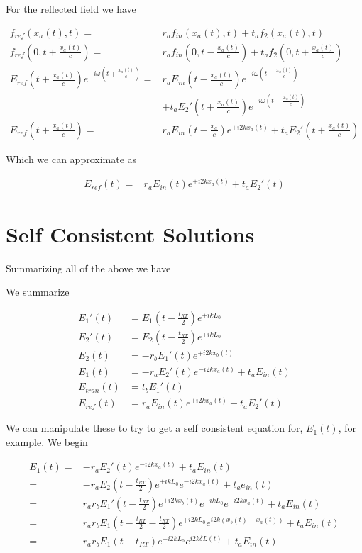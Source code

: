 \documentclass[12pt]{article}
\begin{document}
For the reflected field we have

\begin{align}
f_{ref}(x_a(t), t) =& r_a f_{in}(x_a(t), t) + t_a f_2(x_a(t), t)\\
f_{ref}\left(0, t+\frac{x_a(t)}{c}\right) =& r_a f_{in}\left(0, t-\frac{x_a(t)}{c}\right) + t_a f_2\left(0, t+\frac{x_a(t)}{c}\right)\\
E_{ref}\left(t+\frac{x_a(t)}{c}\right)e^{-i\omega\left(t+\frac{x_a(t)}{c}\right)} =& r_a E_{in}\left(t-\frac{x_a(t)}{c}\right)e^{-i\omega\left(t-\frac{x_a(t)}{c}\right)}\\
&+t_aE_2'\left(t+\frac{x_a(t)}{c}\right)e^{-i\omega\left(t+\frac{x_a(t)}{c}\right)}\\
E_{ref}\left(t+\frac{x_a(t)}{c}\right) =&r_aE_{in}\left(t-\frac{x_a}{c}\right)e^{+i2kx_a(t)} + t_aE_2'\left(t+\frac{x_a(t)}{c}\right)
\end{align}

Which we can approximate as

\begin{align}
E_{ref}(t) =&r_aE_{in}(t)e^{+i2kx_a(t)} + t_aE_2'(t)
\end{align}

\section{Self Consistent Solutions}

Summarizing all of the above we have

We summarize

\begin{align}
E_1'(t) &= E_1\left(t-\frac{t_{RT}}{2}\right)e^{+ikL_0}\\
E_2'(t) &= E_2\left(t-\frac{t_{RT}}{2}\right)e^{+ikL_0}\\
E_2(t) &= -r_b E_1'(t) e^{+i2kx_b(t)}\\
E_1(t) &= -r_a E_2'(t)e^{-i2kx_a(t)} + t_aE_{in}(t)\\
E_{tran}(t) &= t_bE_1'(t)\\
E_{ref}(t) &= r_aE_{in}(t)e^{+i2kx_a(t)} + t_a E_2'(t)
\end{align}

We can manipulate these to try to get a self consistent equation for, $E_1(t)$, for example. We begin

\begin{align}
E_1(t) =& -r_aE_2'(t)e^{-i2kx_a(t)} + t_a E_{in}(t)\\
=& -r_a E_2\left(t-\frac{t_{RT}}{2}\right)e^{+ikL_0}e^{-i2kx_a(t)} + t_ae_{in}(t)\\
=& r_ar_bE_1'\left(t-\frac{t_{RT}}{2}\right)e^{+i2kx_b(t)}e^{+ikL_0}e^{-i2kx_a(t)} + t_aE_{in}(t)\\
=& r_ar_bE_1\left(t-\frac{t_{RT}}{2}-\frac{t_{RT}}{2}\right) e^{+i2kL_0}e^{i2k(x_b(t)-x_a(t))} + t_aE_{in}(t)\\
=& r_ar_bE_1(t-t_{RT})e^{+i2kL_0}e^{i2k\delta L(t)} + t_a E_{in}(t)
\end{align}
\end{document}
